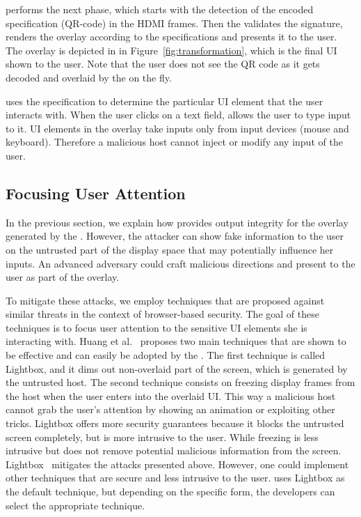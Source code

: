  \device performs the next phase, which starts with the detection of the encoded specification (QR-code) in the HDMI frames. Then the \device validates the signature, renders the overlay according to the specifications and presents it to the user.  The \device overlay is depicted in \three in Figure~\ref{fig:transformation}, which is the final UI shown to the user. Note that the user does not see the QR code as it gets decoded and overlaid by the \device on the fly.

\device uses the specification to determine the particular UI element that the user interacts with. When the user clicks on a text field, \device allows the user to type input to it. UI elements in the overlay take inputs only from input devices (mouse and keyboard). Therefore a malicious host cannot inject or modify any input of the user.

\subsection{Focusing User Attention}
\label{sec:systemDesign:userAttention}

In the previous section, we explain how \name provides output integrity for the overlay generated by the \device. However, the attacker can show fake information to the user on the untrusted part of the display space that may potentially influence her inputs. An advanced adversary could craft malicious directions and present to the user as part of the overlay.

To mitigate these attacks, we employ techniques that are proposed against similar threats in the context of browser-based security. The goal of these techniques is to focus user attention to the sensitive UI elements she is interacting with. Huang et al.~\cite{huang2012clickjacking} proposes two main techniques that are shown to be effective and can easily be adopted by the \device. The first technique is called Lightbox, and it dims out non-overlaid part of the screen, which is generated by the untrusted host. The second technique consists on freezing display frames from the host when the user enters into the overlaid UI. This way a malicious host cannot grab the user's attention by showing an animation or exploiting other tricks.
Lightbox offers more security guarantees because it blocks the untrusted screen completely, but is more intrusive to the user. While freezing is less intrusive but does not remove potential malicious information from the screen.
Lightbox~\cite{huang2012clickjacking} mitigates the attacks presented above. However, one could implement other techniques that are secure and less intrusive to the user.
\device uses Lightbox as the default technique, but depending on the specific form, the developers can select the appropriate technique.

